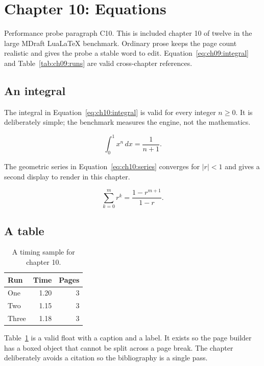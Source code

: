 \section{Chapter 10: Equations}
\label{sec:ch10}

Performance probe paragraph C10. This is included chapter 10 of twelve in
the large MDraft LuaLaTeX benchmark. Ordinary prose keeps the page count
realistic and gives the probe a stable word to edit. Equation~\ref{eq:ch09:integral} and
Table~\ref{tab:ch09:runs} are valid cross-chapter references.

\subsection{An integral}
The integral in Equation~\ref{eq:ch10:integral} is valid for every integer
$n \ge 0$. It is deliberately simple; the benchmark measures the engine, not
the mathematics.

\begin{equation}
  \label{eq:ch10:integral}
  \int_{0}^{1} x^{n}\,dx = \frac{1}{n+1}.
\end{equation}

The geometric series in Equation~\ref{eq:ch10:series} converges for
$|r| < 1$ and gives a second display to render in this chapter.

\begin{equation}
  \label{eq:ch10:series}
  \sum_{k=0}^{m} r^{k} = \frac{1-r^{m+1}}{1-r}.
\end{equation}

\subsection{A table}
\begin{table}[h]
  \centering
  \begin{tabular}{lrr}
    \toprule
    Run & Time & Pages \\
    \midrule
    One   & 1.20 & 3 \\
    Two   & 1.15 & 3 \\
    Three & 1.18 & 3 \\
    \bottomrule
  \end{tabular}
  \caption{A timing sample for chapter 10.}
  \label{tab:ch10:runs}
\end{table}

Table~\ref{tab:ch10:runs} is a valid float with a caption and a label. It
exists so the page builder has a boxed object that cannot be split across a
page break. The chapter deliberately avoids a citation so the bibliography is a single pass.

